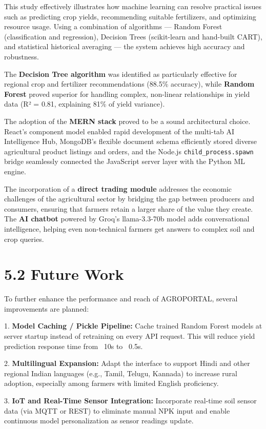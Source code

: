 \documentclass[12pt,a4paper]{report}
\begin{document}
This study effectively illustrates how machine learning can resolve practical issues such as predicting crop yields, recommending suitable fertilizers, and optimizing resource usage. Using a combination of algorithms — Random Forest (classification and regression), Decision Trees (scikit-learn and hand-built CART), and statistical historical averaging — the system achieves high accuracy and robustness.

The \textbf{Decision Tree algorithm} was identified as particularly effective for regional crop and fertilizer recommendations (88.5\% accuracy), while \textbf{Random Forest} proved superior for handling complex, non-linear relationships in yield data (R² = 0.81, explaining 81\% of yield variance).

The adoption of the \textbf{MERN stack} proved to be a sound architectural choice. React's component model enabled rapid development of the multi-tab AI Intelligence Hub, MongoDB's flexible document schema efficiently stored diverse agricultural product listings and orders, and the Node.js \texttt{child\_process.spawn} bridge seamlessly connected the JavaScript server layer with the Python ML engine.

The incorporation of a \textbf{direct trading module} addresses the economic challenges of the agricultural sector by bridging the gap between producers and consumers, ensuring that farmers retain a larger share of the value they create. The \textbf{AI chatbot} powered by Groq's llama-3.3-70b model adds conversational intelligence, helping even non-technical farmers get answers to complex soil and crop queries.

\section{5.2 Future Work}

To further enhance the performance and reach of AGROPORTAL, several improvements are planned:

1. \textbf{Model Caching / Pickle Pipeline:} Cache trained Random Forest models at server startup instead of retraining on every API request. This will reduce yield prediction response time from ~10s to ~0.5s.

2. \textbf{Multilingual Expansion:} Adapt the interface to support Hindi and other regional Indian languages (e.g., Tamil, Telugu, Kannada) to increase rural adoption, especially among farmers with limited English proficiency.

3. \textbf{IoT and Real-Time Sensor Integration:} Incorporate real-time soil sensor data (via MQTT or REST) to eliminate manual NPK input and enable continuous model personalization as sensor readings update.
\end{document}
